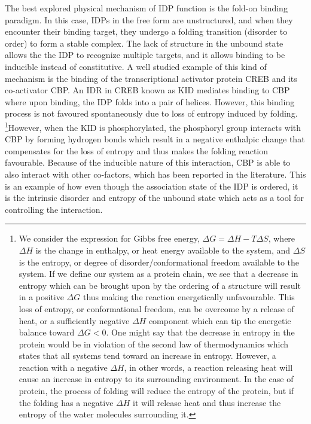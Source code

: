 The best explored physical mechanism of IDP function is the fold-on binding paradigm. In this case, IDPs in the free form are unstructured, and when they encounter their binding target, they undergo a folding transition (disorder to order) to form a stable complex. The lack of structure in the unbound state allows the the IDP to recognize multiple targets, and it allows binding to be inducible instead of constitutive. A well studied example of this kind of mechanism is the binding of the transcriptional activator protein CREB and its co-activator CBP. An IDR in CREB known as KID mediates binding to CBP where upon binding, the IDP folds into a pair of helices. However, this binding process is not favoured spontaneously due to loss of entropy induced by folding. \footnote{We consider the expression for Gibbs free energy, $\Delta G = \Delta H - T\Delta S$, where $\Delta H$ is the change in enthalpy, or heat energy available to the system, and $\Delta S$ is the entropy, or degree of disorder/conformational freedom available to the system. If we define our system as a protein chain, we see that a decrease in entropy which can be brought upon by the ordering of a structure will result in a positive $\Delta G$ thus making the reaction energetically unfavourable. This loss of entropy, or conformational freedom, can be overcome by a release of heat, or a sufficiently negative $\Delta H$ component which can tip the energetic balance toward $\Delta G < 0$. One might say that the decrease in entropy in the protein would be in violation of the second law of thermodynamics which states that all systems tend toward an increase in entropy. However, a reaction with a negative $\Delta H$, in other words, a reaction releasing heat will cause an increase in entropy to its surrounding environment. In the case of protein, the process of folding will reduce the entropy of the protein, but if the folding has a negative $\Delta H$ it will release heat and thus increase the entropy of the water molecules surrounding it.}However, when the KID is phosphorylated, the phosphoryl group interacts with CBP by forming hydrogen bonds which result in a negative enthalpic change that compensates for the loss of entropy and thus makes the folding reaction favourable. Because of the inducible nature of this interaction, CBP is able to also interact with other co-factors, which has been reported in the literature. \cite{radhakrishnan1997solution} This is an example of how even though the association state of the IDP is ordered, it is  the intrinsic disorder and entropy of the unbound state which acts as a tool for controlling the interaction. \\


